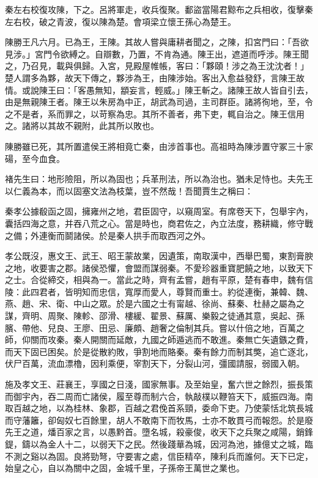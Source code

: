 \begin{pinyinscope}
秦左右校復攻陳，下之。呂將軍走，收兵復聚。鄱盜當陽君黥布之兵相收，復擊秦左右校，破之青波，復以陳為楚。會項梁立懷王孫心為楚王。

陳勝王凡六月。已為王，王陳。其故人嘗與庸耕者聞之，之陳，扣宮門曰：「吾欲見涉。」宮門令欲縛之。自辯數，乃置，不肯為通。陳王出，遮道而呼涉。陳王聞之，乃召見，載與俱歸。入宮，見殿屋帷帳，客曰：「夥頤！涉之為王沈沈者！」楚人謂多為夥，故天下傳之，夥涉為王，由陳涉始。客出入愈益發舒，言陳王故情。或說陳王曰：「客愚無知，顓妄言，輕威。」陳王斬之。諸陳王故人皆自引去，由是無親陳王者。陳王以朱房為中正，胡武為司過，主司群臣。諸將徇地，至，令之不是者，系而罪之，以苛察為忠。其所不善者，弗下吏，輒自治之。陳王信用之。諸將以其故不親附，此其所以敗也。

陳勝雖已死，其所置遣侯王將相竟亡秦，由涉首事也。高祖時為陳涉置守冢三十家碭，至今血食。

褚先生曰：地形險阻，所以為固也；兵革刑法，所以為治也。猶未足恃也。夫先王以仁義為本，而以固塞文法為枝葉，豈不然哉！吾聞賈生之稱曰：

秦孝公據殽函之固，擁雍州之地，君臣固守，以窺周室。有席卷天下，包舉宇內，囊括四海之意，并吞八荒之心。當是時也，商君佐之，內立法度，務耕織，修守戰之備；外連衡而鬬諸侯。於是秦人拱手而取西河之外。

孝公既沒，惠文王、武王、昭王蒙故業，因遺策，南取漢中，西舉巴蜀，東割膏腴之地，收要害之郡。諸侯恐懼，會盟而謀弱秦。不愛珍器重寶肥饒之地，以致天下之士。合從締交，相與為一。當此之時，齊有孟嘗，趙有平原，楚有春申，魏有信陵：此四君者，皆明知而忠信，寬厚而愛人，尊賢而重士。約從連衡，兼韓、魏、燕、趙、宋、衛、中山之眾。於是六國之士有甯越、徐尚、蘇秦、杜赫之屬為之謀，齊明、周聚、陳軫、邵滑、樓緩、翟景、蘇厲、樂毅之徒通其意，吳起、孫臏、帶他、兒良、王廖、田忌、廉頗、趙奢之倫制其兵。嘗以什倍之地，百萬之師，仰關而攻秦。秦人開關而延敵，九國之師遁逃而不敢進。秦無亡矢遺鏃之費，而天下固已困矣。於是從散約敗，爭割地而賂秦。秦有餘力而制其獘，追亡逐北，伏尸百萬，流血漂櫓，因利乘便，宰割天下，分裂山河，彊國請服，弱國入朝。

施及孝文王、莊襄王，享國之日淺，國家無事。及至始皇，奮六世之餘烈，振長策而御宇內，吞二周而亡諸侯，履至尊而制六合，執敲樸以鞭笞天下，威振四海。南取百越之地，以為桂林、象郡，百越之君俛首系頸，委命下吏。乃使蒙恬北筑長城而守藩籬，卻匈奴七百餘里，胡人不敢南下而牧馬，士亦不敢貫弓而報怨。於是廢先王之道，燔百家之言，以愚黔首。墮名城，殺豪俊，收天下之兵聚之咸陽，銷鋒鍉，鑄以為金人十二，以弱天下之民。然後踐華為城，因河為池，據億丈之城，臨不測之谿以為固。良將勁弩，守要害之處，信臣精卒，陳利兵而誰何。天下已定，始皇之心，自以為關中之固，金城千里，子孫帝王萬世之業也。


\end{pinyinscope}

